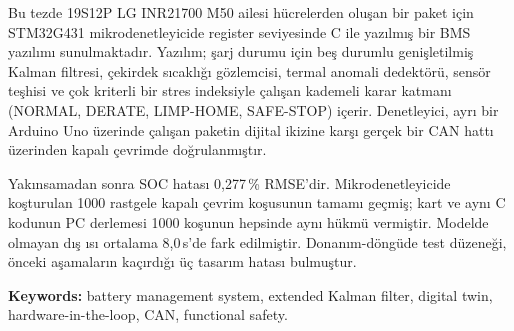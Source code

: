 Bu tezde 19S12P LG INR21700 M50 ailesi hücrelerden oluşan bir paket için STM32G431 mikrodenetleyicide register seviyesinde C ile yazılmış bir BMS yazılımı sunulmaktadır. Yazılım; şarj durumu için beş durumlu genişletilmiş Kalman filtresi, çekirdek sıcaklığı gözlemcisi, termal anomali dedektörü, sensör teşhisi ve çok kriterli bir stres indeksiyle çalışan kademeli karar katmanı (NORMAL, DERATE, LIMP-HOME, SAFE-STOP) içerir. Denetleyici, ayrı bir Arduino Uno üzerinde çalışan paketin dijital ikizine karşı gerçek bir CAN hattı üzerinden kapalı çevrimde doğrulanmıştır.

Yakınsamadan sonra SOC hatası 0,277\,\% RMSE'dir. Mikrodenetleyicide koşturulan 1000 rastgele kapalı çevrim koşusunun tamamı geçmiş; kart ve aynı C kodunun PC derlemesi 1000 koşunun hepsinde aynı hükmü vermiştir. Modelde olmayan dış ısı ortalama 8,0\,s'de fark edilmiştir. Donanım-döngüde test düzeneği, önceki aşamaların kaçırdığı üç tasarım hatası bulmuştur.

\textbf{Keywords:} battery management system, extended Kalman filter, digital twin, hardware-in-the-loop, CAN, functional safety.
